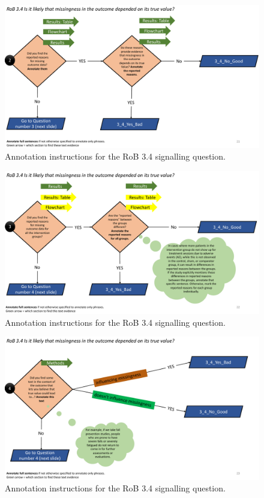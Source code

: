 \documentclass[sn-mathphys,Numbered]{sn-jnl}%
\begin{document}
\begin{figure}[hbt]
    \centering
    \includegraphics[width=\textwidth]{figures/3_4_2.pdf}
    \caption{Annotation instructions for the RoB 3.4 signalling question.}
    \label{fig:3_4_2}
\end{figure}


\begin{figure}[hbt]
    \centering
    \includegraphics[width=\textwidth]{figures/3_4_3.pdf}
    \caption{Annotation instructions for the RoB 3.4 signalling question.}
    \label{fig:3_4_3}
\end{figure}


\begin{figure}[hbt]
    \centering
    \includegraphics[width=\textwidth]{figures/3_4_4.pdf}
    \caption{Annotation instructions for the RoB 3.4 signalling question.}
    \label{fig:3_4_4}
\end{figure}
\end{document}
